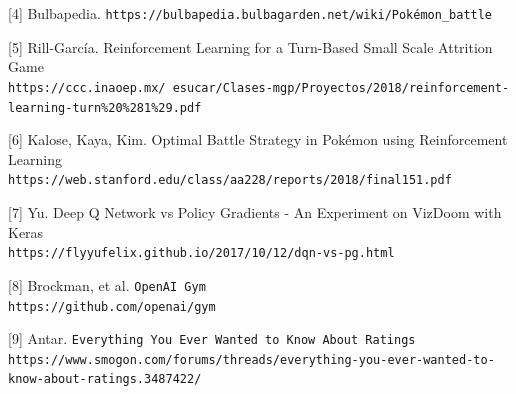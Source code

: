 \documentclass{article}
\begin{document}
[4] Bulbapedia. \texttt{https://bulbapedia.bulbagarden.net/wiki/Pokémon\_battle}

[5] Rill-García. Reinforcement Learning for a Turn-Based Small Scale Attrition Game\\
\texttt{https://ccc.inaoep.mx/~esucar/Clases-mgp/Proyectos/2018/reinforcement-learning-turn\%20\%281\%29.pdf}

[6] Kalose, Kaya, Kim. Optimal Battle Strategy in Pokémon using Reinforcement Learning\\
\texttt{https://web.stanford.edu/class/aa228/reports/2018/final151.pdf}

[7] Yu. Deep Q Network vs Policy Gradients - An Experiment on VizDoom with Keras\\
\texttt{https://flyyufelix.github.io/2017/10/12/dqn-vs-pg.html}

[8] Brockman, et al. \texttt{OpenAI Gym}\\
\texttt{https://github.com/openai/gym}

[9] Antar. \texttt{Everything You Ever Wanted to Know About Ratings}\\
\texttt{https://www.smogon.com/forums/threads/everything-you-ever-wanted-to-know-about-ratings.3487422/}
\end{document}
